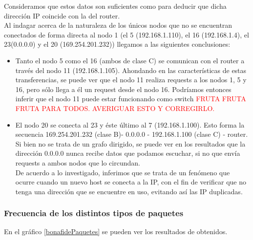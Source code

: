 Consideramos que estos datos son suficientes como para deducir que dicha direcci\'on IP coincide con la del router.\\
Al indagar acerca de la naturaleza de los \'unicos nodos que no se encuentran conectados de forma directa al nodo 1 (el 5 (192.168.1.110), el 16 (192.168.1.4), el 23(0.0.0.0) y el 20 (169.254.201.232)) llegamos a las siguientes conclusiones: \\
\begin{itemize}
	\item Tanto el nodo 5 como el 16 (ambos de clase C) se comunican con el router a trav\'es del nodo 11 (192.168.1.105). Ahondando en las caracter\'isticas de estas transferencias, se puede ver que el nodo 11 realiza requests a los nodos 1, 5 y 16, pero s\'olo llega a \'el un request desde el nodo 16. Podr\'iamos entonces inferir que el nodo 11 puede estar funcionando como switch \textcolor{red}{FRUTA FRUTA FRUTA PARA TODOS. AVERIGUAR ESTO Y CORREGIRLO.}
	\item El nodo 20 se conecta al 23 y \'este \'ultimo al 7 (192.168.1.100). Esto forma la secuencia 169.254.201.232 (clase B)- 0.0.0.0 - 192.168.1.100 (clase C) - router. Si bien no se trata de un grafo dirigido, se puede ver en los resultados que la direcci\'on 0.0.0.0 nunca recibe datos que podamos escuchar, si no que env\'ia requests a ambos nodos que lo circundan.\\ De acuerdo a lo investigado, inferimos que se trata de un fen\'omeno que ocurre cuando un nuevo host se conecta a la IP, con el fin de verificar que no tenga una direcci\'on que se encuentre en uso, evitando as\'i las IP duplicadas.\\
\end{itemize}


\subsubsection{Frecuencia de los distintos tipos de paquetes}

En el gr\'afico \ref{bonafidePaquetes} se pueden ver los resultados de obtenidos.

